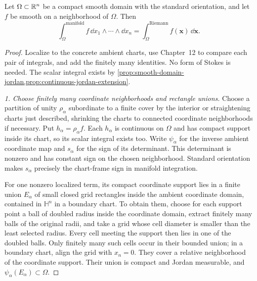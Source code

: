 \begin{proposition}
\label{prop:manifold-riemann-agreement}
Let $\Omega\subset\mathbb{R}^n$ be a compact smooth domain with the standard
orientation, and let $f$ be smooth on a neighborhood of $\Omega$. Then
\[
\int_\Omega^{\mathrm{manifold}}
 f\,\dd x_1\wedge\cdots\wedge\dd x_n
=\int_\Omega^{\mathrm{Riemann}} f(\mathbf{x})\,\dd\mathbf{x}.
\]
\end{proposition}
\begin{proof}
Localize to the concrete ambient charts, use Chapter~12
to compare each pair of integrals, and add the finitely many identities.
No form of Stokes is needed. The scalar integral exists by
\cref{prop:smooth-domain-jordan,prop:continuous-jordan-extension}.

\emph{1. Choose finitely many coordinate neighborhoods and rectangle unions.}
Choose a partition of unity $\rho_\alpha$ subordinate to a finite cover
by the interior or straightening charts just described, shrinking the
charts to connected coordinate neighborhoods if necessary. Put
$h_\alpha=\rho_\alpha f$. Each $h_\alpha$ is continuous on $\Omega$
and has compact support inside its chart, so its scalar integral exists
too. Write $\psi_\alpha$ for the inverse ambient coordinate map and
$s_\alpha$ for the sign of its determinant. This determinant is nonzero
and has constant sign on the chosen neighborhood. Standard orientation
makes $s_\alpha$ precisely the chart-frame sign in manifold integration.

For one nonzero localized term, its compact coordinate support lies in a
finite union $E_\alpha$ of small closed grid rectangles inside the ambient
coordinate domain, contained in $\mathbb H^n$ in a boundary chart. To obtain
them, choose for each support point a ball of doubled radius inside the
coordinate domain, extract finitely many balls of the original radii, and
take a grid whose cell diameter is smaller than the least selected radius.
Every cell meeting the support then lies in one of the doubled balls. Only
finitely many such cells occur in their bounded union; in a boundary chart,
align the grid with $x_n=0$.
They cover a relative neighborhood of the coordinate support. Their union
is compact and Jordan measurable, and $\psi_\alpha(E_\alpha)\subset\Omega$.


\end{proof}
